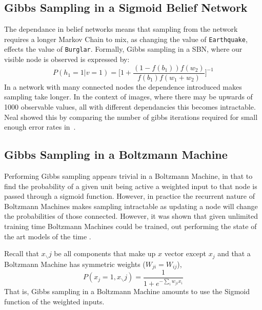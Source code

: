 \subsection{Gibbs Sampling in a Sigmoid Belief Network}

The dependance in belief networks means that sampling from the network requires a longer Markov Chain to mix, as changing the value of \texttt{Earthquake}, effects the value of \texttt{Burglar}. Formally, Gibbs sampling in a SBN, where our visible node is observed is expressed by:
$$
P(h_1 = 1|v = 1) = \bigg[1 + \frac{(1 - f(b_1))f(w_2)}{f(b_1)f(w_1 + w_2)} \bigg]^{-1}
$$
In a network with many connected nodes the dependence introduced makes sampling take longer. In the context of images, where there may be upwards of 1000 observable values, all with different dependancies this becomes intractable. Neal showed this by comparing the number of gibbs iterations required for small enough error rates in~\cite{neal1992:connectionist}.

\subsection{Gibbs Sampling in a Boltzmann Machine}

Performing Gibbs sampling appears trivial in a Boltzmann Machine, in that to find the probability of a given unit being active a weighted input to that node is passed through a sigmoid function. However, in practice the recurrent nature of Boltzmann Machines makes sampling intractable as updating a node will change the probabilities of those connected. However, it was shown that given unlimited training time Boltzmann Machines could be trained, out performing the state of the art models of the time .

Recall that $ x_{\smallsetminus} j$ be all components that make up $x$ vector except $x_j$ and that a Boltzmann Machine has symmetric weights ($ W_{ji} = W_{ij} $),
$$
P(x_j = 1, x_{\smallsetminus}j) = \frac{1}{1 + e^{-\sum_i w_{ji}x_i}}
$$
That is, Gibbs sampling in a Boltzmann Machine amounts to use the Sigmoid function of the weighted inputs.


